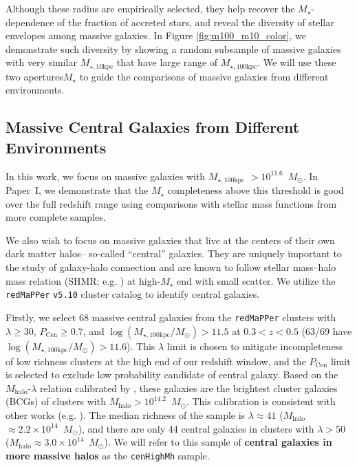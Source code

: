 \documentclass[a4paper,fleqn,usenatbib]{mnras}
\def\msun{$M_\odot$}
\def\redm{\texttt{redMaPPer}}
\def\rbcg{\texttt{cenHighMh}}
\def\mstar{{$M_{\star}$}}
\def\mhalo{{$M_{\mathrm{halo}}$}}
\def\minn{{$M_{\star,10\mathrm{kpc}}$}}
\def\mtot{{$M_{\star,100\mathrm{kpc}}$}}
\def\logmtot{{$\log (M_{\star,100\mathrm{kpc}}/M_{\odot})$}}
\begin{document}
   Although these radius are empirically selected, they help recover the 
   \mstar{}-dependence of the fraction of accreted stars, and reveal the diversity of 
   stellar envelopes among massive galaxies. 
   In Figure \ref{fig:m100_m10_color}, we demonstrate such diversity by showing 
   a random subsample of massive galaxies with very similar \minn{} that have large 
   range of \mtot{}. 
   We will use these two apertures\mstar{} to guide the comparisons of massive galaxies 
   from different environments.  
    
\subsection{Massive Central Galaxies from Different Environments}
    \label{ssec:cen}
         
    In this work, we focus on massive galaxies with \mtot{} $>10^{11.6}$~\msun{}. 
    In Paper~I, we demonstrate that the \mstar{} completeness above this threshold is 
    good over the full redshift range using comparisons with stellar mass functions 
    from more complete samples.
    
    We also wish to focus on massive galaxies that live at the centers of their own 
    dark matter halos-- so-called ``central'' galaxies.  
    They are uniquely important to the study of galaxy-halo connection and are known 
    to follow stellar mass--halo mass relation (SHMR; e.g. \citealt{Leauthaud2012, 
    Behroozi2013, Kravtsov2014, Tinker2017}) at high-\mstar{} end with small scatter.
    We utilize the \redm{} \texttt{v5.10} \citep{Rykoff2014, Rozo2015b} cluster catalog 
    to identify central galaxies. 
    
    Firstly, we select 68 massive central galaxies from the \redm{} clusters 
    with $\lambda \geq 30$, $P_{\mathrm{Cen}} \geq 0.7$, and \logmtot{}$>11.5$ 
    at $0.3 < z < 0.5$ (63/69 have \logmtot{}$>11.6$). 
    This $\lambda$ limit is chosen to mitigate incompleteness of low richness clusters
    at the high end of our redshift window, and the $P_{\mathrm{Cen}}$ limit is 
    selected to exclude low probability candidate of central galaxy. 
    Based on the \mhalo{}-$\lambda$ relation calibrated by \citet{Simet2016}, these 
    galaxies are the brightest cluster galaxies (BCGs) of clusters with 
    \mhalo{}$>10^{14.2}$~\msun{}.
    This calibration is consistent with other works (e.g. \citealt{Saro2015, Farahi2016, 
    Melchior2016, Murata2017}). 
    The median richness of the sample is $\lambda \approx 41$ 
    (\mhalo{}$\approx 2.2 \times 10^{14}$~\msun{}), and there are 
    only 44 central galaxies in clusters with $\lambda>50$ 
    (\mhalo{}$\approx 3.0 \times 10^{14}$~\msun{}).
    We will refer to this sample of \textbf{central galaxies in more massive halos} as 
    the \rbcg{} sample.
    
\end{document}
